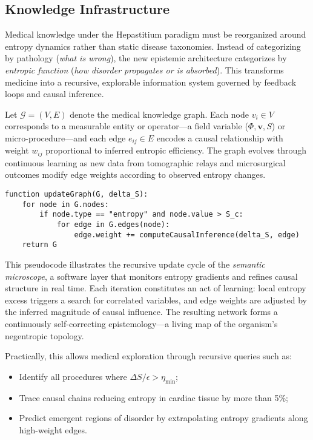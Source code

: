 \documentclass[12pt]{article}
\begin{document}
\subsection{Knowledge Infrastructure}
\label{subsec:knowledge_infrastructure}

Medical knowledge under the Hepastitium paradigm must be reorganized around entropy dynamics rather than static
disease taxonomies.  Instead of categorizing by pathology (\emph{what is wrong}), the new epistemic architecture
categorizes by \emph{entropic function} (\emph{how disorder propagates or is absorbed}).  This transforms medicine
into a recursive, explorable information system governed by feedback loops and causal inference.

Let \(\mathcal{G} = (V,E)\) denote the medical knowledge graph.  
Each node \(v_i \in V\) corresponds to a measurable entity or operator---a field variable
(\(\Phi,\mathbf{v},S\)) or micro-procedure---and each edge \(e_{ij} \in E\) encodes a causal relationship with
weight \(w_{ij}\) proportional to inferred entropic efficiency.  
The graph evolves through continuous learning as new data from tomographic relays and microsurgical outcomes
modify edge weights according to observed entropy changes.

\begin{verbatim}
function updateGraph(G, delta_S):
    for node in G.nodes:
        if node.type == "entropy" and node.value > S_c:
            for edge in G.edges(node):
                edge.weight += computeCausalInference(delta_S, edge)
    return G
\end{verbatim}

This pseudocode illustrates the recursive update cycle of the \emph{semantic microscope}, a software layer that
monitors entropy gradients and refines causal structure in real time.  
Each iteration constitutes an act of learning: local entropy excess triggers a search for correlated variables,
and edge weights are adjusted by the inferred magnitude of causal influence.  
The resulting network forms a continuously self-correcting epistemology---a living map of the organism’s
negentropic topology.

Practically, this allows medical exploration through recursive queries such as:
\begin{itemize}
  \item Identify all procedures where \(\Delta S / \epsilon > \eta_{\mathrm{min}}\);
  \item Trace causal chains reducing entropy in cardiac tissue by more than 5\%;
  \item Predict emergent regions of disorder by extrapolating entropy gradients along high-weight edges.
\end{itemize}
\end{document}
